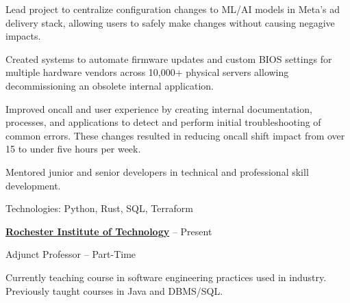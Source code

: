 \documentclass[letterpaper,MMMMyyyy,nonstopmode]{simpleresumecv}
\newif\ifLOCATION
\begin{document}
\begin{Body}
\begin{Detail}

\BulletItem
Lead project to centralize configuration changes to ML/AI models in Meta's ad delivery stack, allowing users to safely make changes without causing negagive impacts.

\BulletItem
Created systems to automate firmware updates and custom BIOS settings for multiple hardware vendors across 10,000+ physical servers allowing decommissioning an obsolete internal application. 

\BulletItem
Improved oncall and user experience by creating internal documentation, processes, and applications to detect and perform initial troubleshooting of common errors.
These changes resulted in reducing oncall shift impact from over 15 to under five hours per week.

\BulletItem
Mentored junior and senior developers in technical and professional skill development.


\Gap
Technologies: Python, Rust, SQL, Terraform

\Gap

\end{Detail}

\BigGap

\Entry
\href{http://ist.rit.edu/}
{\textbf{Rochester Institute of Technology}}
\hfill
 --
Present

Adjunct Professor -- Part-Time
\ifLOCATION
\hfill 
Rochester, New York
\fi

\begin{Detail}
\BulletItem
Currently teaching course in software engineering practices used in industry.
\BulletItem
Previously taught courses in Java and DBMS/SQL.
\end{Detail}


\end{Body}
\end{document}
